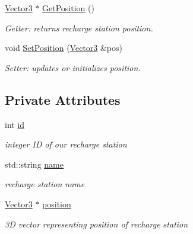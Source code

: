 \begin{DoxyCompactItemize}
\hyperlink{classVector3}{Vector3} $\ast$ \hyperlink{classRechargeStation_a9279c23b6e63f23ea2d6e27361f0c909}{Get\+Position} ()
\begin{DoxyCompactList}\small\item\em Getter\+: returns recharge station position. \end{DoxyCompactList}\item 
\mbox{\label{classRechargeStation_aeaf35aeefc07c2377f4d4534f059bb96}} 
void \hyperlink{classRechargeStation_aeaf35aeefc07c2377f4d4534f059bb96}{Set\+Position} (\hyperlink{classVector3}{Vector3} \&pos)
\begin{DoxyCompactList}\small\item\em Setter\+: updates or initializes position. \end{DoxyCompactList}\end{DoxyCompactItemize}
\subsection*{Private Attributes}
\begin{DoxyCompactItemize}
\item 
\mbox{\label{classRechargeStation_a9caf990cd46c4b31d3258a76799f1f58}} 
int \hyperlink{classRechargeStation_a9caf990cd46c4b31d3258a76799f1f58}{id}
\begin{DoxyCompactList}\small\item\em integer ID of our recharge station \end{DoxyCompactList}\item 
\mbox{\label{classRechargeStation_a4371be4616b798f2bdb5f8974dd5f53c}} 
std\+::string \hyperlink{classRechargeStation_a4371be4616b798f2bdb5f8974dd5f53c}{name}
\begin{DoxyCompactList}\small\item\em recharge station name \end{DoxyCompactList}\item 
\mbox{\label{classRechargeStation_a6baf3e3e247af8cd9d9d5ab36eded6c1}} 
\hyperlink{classVector3}{Vector3} $\ast$ \hyperlink{classRechargeStation_a6baf3e3e247af8cd9d9d5ab36eded6c1}{position}
\begin{DoxyCompactList}\small\item\em 3D vector representing position of recharge station \end{DoxyCompactList}\end{DoxyCompactItemize}



